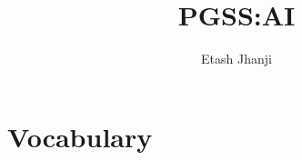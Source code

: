 \documentclass[12pt,letterpaper, twocolumn]{article}
\author{Etash Jhanji}
\title{PGSS:\@ AI}
\date{}
\begin{document}
\maketitle


\section{Vocabulary}
\end{document}
